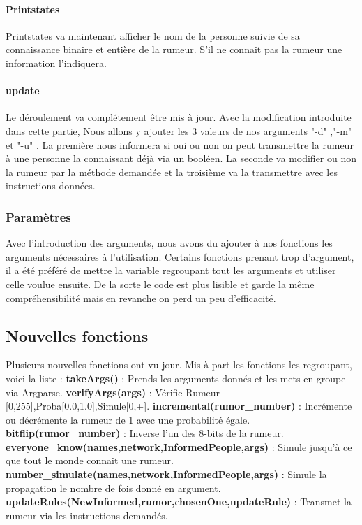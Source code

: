 \documentclass[a4paper,11pt]{article}
\begin{document}
\paragraph{Printstates\newline}
{Printstates va maintenant afficher le nom de la personne suivie de sa connaissance binaire et entière de la rumeur.
S'il ne connait pas la rumeur une information l'indiquera.}
\paragraph{update\newline}
{Le déroulement va complétement être mis à jour. Avec la modification introduite dans cette partie, Nous allons y ajouter 
les 3 valeurs de nos arguments "-d" ,"-m" et "-u" . La première nous informera si oui ou non on peut transmettre la rumeur à
une personne la connaissant déjà via un booléen. La seconde va modifier ou non la rumeur par la méthode demandée et la troisième 
va la transmettre avec les instructions données.}
\subsubsection{Paramètres}
{Avec l'introduction des arguments, nous avons du ajouter à nos fonctions les arguments nécessaires à l'utilisation.
Certains fonctions prenant trop d'argument, il a été préféré de mettre la variable regroupant tout les arguments et utiliser
celle voulue ensuite. De la sorte le code est plus lisible et garde la même compréhensibilité mais en revanche on perd un peu
d'efficacité.}
\subsection{Nouvelles fonctions}
{Plusieurs nouvelles fonctions ont vu jour. Mis à part les fonctions les regroupant, voici la liste :
\newline \textbf{takeArgs()} : Prends les arguments donnés et les mets en groupe via Argparse.
\newline \textbf{verifyArgs(args)} : Vérifie Rumeur [0,255],Proba[0.0,1.0],Simule[0,+].
\newline \textbf{incremental(rumor\_number)} : Incrémente ou décrémente la rumeur de 1 avec une probabilité égale.
\newline \textbf{bitflip(rumor\_number)} : Inverse l'un des 8-bits de la rumeur.
\newline \textbf{everyone\_know(names,network,InformedPeople,args)} : Simule jusqu'à ce que tout le monde connait une rumeur.
\newline \textbf{number\_simulate(names,network,InformedPeople,args)} : Simule la propagation le nombre de fois donné en argument.
\newline \textbf{updateRules(NewInformed,rumor,chosenOne,updateRule)} : Transmet la rumeur via les instructions demandés.}
\end{document}
